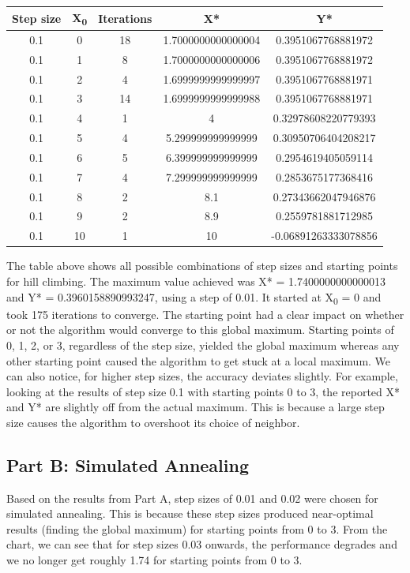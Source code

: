 \documentclass[paper=a4, fontsize=11pt]{scrartcl} %
\numberwithin{equation}{section} %
\numberwithin{figure}{section} %
\numberwithin{table}{section} %
\begin{document}
\begin{center}
\begin{tabular}{ |c|c|c|c|c| } 
	\hline
	\textbf{Step size} & \textbf{X\textsubscript{0}} & \textbf{Iterations} & \textbf{X*} & \textbf{Y*} \\ 
	\hline
    0.1 & 0 & 18 & 1.7000000000000004 & 0.3951067768881972 \\
    0.1 & 1 & 8 & 1.7000000000000006 & 0.3951067768881972 \\
    0.1 & 2 & 4 & 1.6999999999999997 & 0.3951067768881971 \\
    0.1 & 3 & 14 & 1.6999999999999988 & 0.3951067768881971 \\
    0.1 & 4 & 1 & 4 & 0.32978608220779393 \\
    0.1 & 5 & 4 & 5.299999999999999 & 0.30950706404208217 \\
    0.1 & 6 & 5 & 6.399999999999999 & 0.2954619405059114 \\
    0.1 & 7 & 4 & 7.299999999999999 & 0.2853675177368416 \\
    0.1 & 8 & 2 & 8.1 & 0.27343662047946876 \\
    0.1 & 9 & 2 & 8.9 & 0.2559781881712985 \\
    0.1 & 10 & 1 & 10 & -0.06891263333078856 \\
    \hline
\end{tabular}
\end{center}

The table above shows all possible combinations of step sizes and starting points for hill climbing. The maximum value achieved was X* = 1.7400000000000013 and Y* = 0.3960158890993247, using a step of 0.01. It started at X\textsubscript{0} = 0 and took 175 iterations to converge. The starting point had a clear impact on whether or not the algorithm would converge to this global maximum. Starting points of 0, 1, 2, or 3, regardless of the step size, yielded the global maximum whereas any other starting point caused the algorithm to get stuck at a local maximum. We can also notice, for higher step sizes, the accuracy deviates slightly. For example, looking at the results of step size 0.1 with starting points 0 to 3, the reported X* and Y* are slightly off from the actual maximum. This is because a large step size causes the algorithm to overshoot its choice of neighbor.

\subsection{Part B: Simulated Annealing}
Based on the results from Part A, step sizes of 0.01 and 0.02 were chosen for simulated annealing. This is because these step sizes produced near-optimal results (finding the global maximum) for starting points from 0 to 3. From the chart, we can see that for step sizes 0.03 onwards, the performance degrades and we no longer get roughly 1.74 for starting points from 0 to 3.
\end{document}
